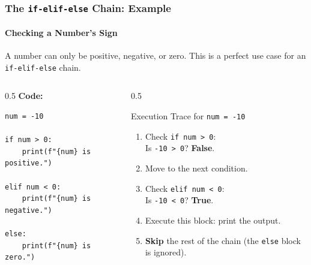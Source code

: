 \documentclass{beamer}
\begin{document}
\begin{frame}[fragile]
    \frametitle{The \texttt{if-elif-else} Chain: Example}
    \framesubtitle{Checking a Number's Sign}
    
    A number can only be positive, negative, or zero. This is a perfect use case for an \texttt{if-elif-else} chain.
    
    \vspace{1em}
    
    \begin{columns}[T] %
        \begin{column}{0.5\textwidth}
            \textbf{Code:}
\begin{verbatim}
num = -10

if num > 0:
    print(f"{num} is positive.")
    
elif num < 0:
    print(f"{num} is negative.")
    
else:
    print(f"{num} is zero.")
\end{verbatim}
        \end{column}
        
        \begin{column}{0.5\textwidth}
            \pause
            \begin{block}{Execution Trace for \texttt{num = -10}}
                \begin{enumerate}
                    \item Check \texttt{if num > 0}:\\ Is \texttt{-10 > 0}? \textbf{False}.
                    \item Move to the next condition.
                    \item Check \texttt{elif num < 0}:\\ Is \texttt{-10 < 0}? \textbf{True}.
                    \item Execute this block: print the output.
                    \item \textbf{Skip} the rest of the chain (the \texttt{else} block is ignored).
                \end{enumerate}
            \end{block}
        \end{column}
    \end{columns}
    
\end{frame}
\end{document}
